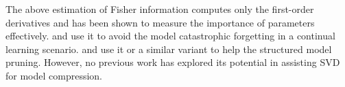The above estimation of Fisher information computes only the first-order derivatives and has been shown to measure the importance of parameters effectively. \cite{kirkpatrick2017overcoming} and \cite{hua2021hyperparameter} use it to avoid the model catastrophic forgetting in a continual learning scenario.
\cite{liu2021group} and \cite{molchanov2019importance} use it or a similar variant to help the structured model pruning. However, no previous work has explored its potential in assisting SVD for model compression.
